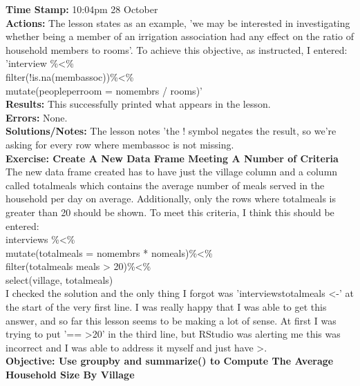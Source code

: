 \documentclass{article}
\begin{document}
\begin{FlushLeft}
\textbf{Time Stamp:} 10:04pm 28 October\\
\textbf{Actions:} The lesson states as an example, 'we may be interested in investigating whether being a member of an irrigation association had any effect on the ratio of household members to rooms'. To achieve this objective, as instructed, I entered:\\
'interview \%\textless\%\\
filter(!is.na(memb\textunderscore assoc))\%\textless\%\\
mutate(people\textunderscore per\textunderscore room = no\textunderscore membrs / rooms)'\\
\textbf{Results:} This successfully printed what appears in the lesson. \\
\textbf{Errors:} None.\\
\textbf{Solutions/Notes:} The lesson notes 'the ! symbol negates the result, so we’re asking for every row where memb\textunderscore assoc is not missing.\\
\vspace{5mm}
\textbf{Exercise: Create A New Data Frame Meeting A Number of Criteria}\\ 
The new data frame created has to have just the village column and a column called total\textunderscore meals which contains the average number of meals served in the household per day on average. Additionally, only the rows where total\textunderscore meals is greater than 20 should be shown. To meet this criteria, I think this should be entered:\\
interviews \%\textless\%\\
mutate(total\textunderscore meals = no\textunderscore membrs * no\textunderscore meals)\%\textless\%\\
filter(total\textunderscore meals meals \textgreater{} 20)\%\textless\%\\
select(village, total\textunderscore meals)\\
I checked the solution and the only thing I forgot was 'interviews\textunderscore total\textunderscore meals \textless -' at the start of the very first line. I was really happy that I was able to get this answer, and so far this lesson seems to be making a lot of sense. At first I was trying to put '== \textgreater 20' in the third line, but RStudio was alerting me this was incorrect and I was able to address it myself and just have \textgreater.\\
\vspace{5mm}
\textbf{Objective: Use group\textunderscore by and summarize() to Compute The Average Household Size By Village}\\ 

\end{FlushLeft}
\end{document}
